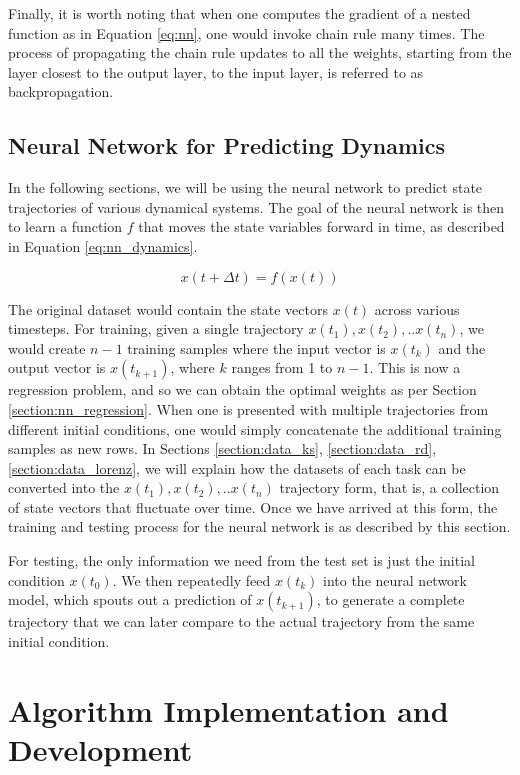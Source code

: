\documentclass[letterpaper, 10 pt, conference]{ieeeconf}  %
\begin{document}
Finally, it is worth noting that when one computes the gradient of a nested function as in Equation \ref{eq:nn}, one would invoke chain rule many times. The process of propagating the chain rule updates to all the weights, starting from the layer closest to the output layer, to the input layer, is referred to as backpropagation. 

\subsection{Neural Network for Predicting Dynamics}
In the following sections, we will be using the neural network to predict state trajectories of various dynamical systems. The goal of the neural network is then to learn a function $f$ that moves the state variables forward in time, as described in Equation \ref{eq:nn_dynamics}.

\begin{equation}
\label{eq:nn_dynamics}
x(t + \Delta t) = f(x(t))
\end{equation}

The original dataset would contain the state vectors $x(t)$ across various timesteps. For training, given a single trajectory $x(t_1), x(t_2), .. x(t_n)$, we would create $n-1$ training samples where the input vector is $x(t_k)$ and the output vector is $x(t_{k+1})$, where $k$ ranges from 1 to $n-1$. This is now a regression problem, and so we can obtain the optimal weights as per Section \ref{section:nn_regression}. When one is presented with multiple trajectories from different initial conditions, one would simply concatenate the additional training samples as new rows.
In Sections \ref{section:data_ks}, \ref{section:data_rd}, \ref{section:data_lorenz}, we will explain how the datasets of each task can be converted into the $x(t_1), x(t_2), .. x(t_n)$ trajectory form, that is, a collection of state vectors that fluctuate over time. Once we have arrived at this form, the training and testing process for the neural network is as described by this section.

For testing, the only information we need from the test set is just the initial condition $x(t_0)$.
We then repeatedly feed $x(t_k)$ into the neural network model, which spouts out a prediction of $x(t_{k+1})$, to generate a complete trajectory that we can later compare to the actual trajectory from the same initial condition.


\section{Algorithm Implementation and Development}
\end{document}
